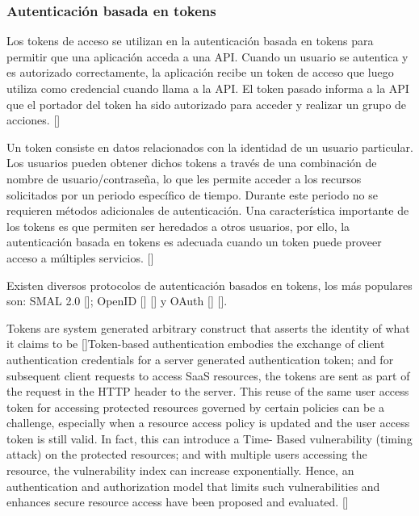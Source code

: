 
\subsubsection*{Autenticación basada en tokens}

Los tokens de acceso se utilizan en la autenticación basada en tokens para permitir que una aplicación acceda a una API. Cuando un usuario se autentica y es autorizado correctamente, la aplicación recibe un token de acceso que luego utiliza como credencial cuando llama a la API. El token pasado informa a la API que el portador del token ha sido autorizado para acceder y realizar un grupo de acciones. [\cite{auth0AccessTokens}]


Un token consiste en datos relacionados con la identidad de un usuario particular. Los usuarios pueden obtener dichos tokens a través de una combinación de nombre de usuario/contraseña, lo que les permite acceder a los recursos solicitados por un periodo específico de tiempo. Durante este periodo no se requieren métodos adicionales de autenticación. Una característica importante de los tokens es que permiten ser heredados a otros usuarios, por ello, la autenticación basada en tokens es adecuada cuando un token puede proveer acceso a múltiples servicios. [\cite{banerjee2018token}] %

Existen diversos protocolos de autenticación basados en tokens, los más populares son: SMAL 2.0 [\cite{cantor2005assertions}]; OpenID [\cite{recordon2006openid}] [\cite{mainka2017sok}] y OAuth [\cite{hardt2012oauth}] [\cite{richer2017oauth}]. 

Tokens are system generated arbitrary construct that asserts the identity of what it claims to be [\cite{zheng2014token}]Token-based authentication embodies the exchange of client authentication credentials for a server generated authentication token; and for subsequent client requests to access SaaS resources, the tokens are sent as part of the request in the HTTP header to the server. This reuse of the same user access token for accessing protected resources governed by certain policies can be a challenge, especially when a resource access policy is updated and the user access token is still valid. In fact, this can introduce a Time- Based vulnerability (timing attack) on the protected resources; and with multiple users accessing the resource, the vulnerability index can increase exponentially. Hence, an authentication and authorization model that limits such vulnerabilities and enhances secure resource access have been proposed and evaluated. [\cite{ethelbert2017json}]

